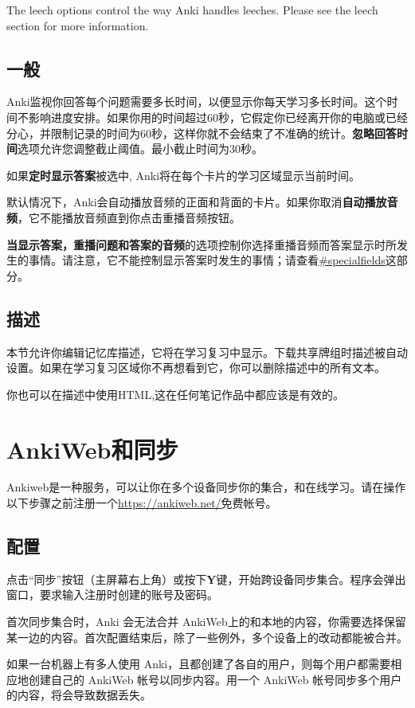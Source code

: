 \documentclass[a4paper]{book}
\begin{document}
	The leech options control the way Anki handles leeches. Please see the leech section for more information.
	\section{一般}
	Anki监视你回答每个问题需要多长时间，以便显示你每天学习多长时间。这个时间不影响进度安排。如果你用的时间超过60秒，它假定你已经离开你的电脑或已经分心，并限制记录的时间为60秒，这样你就不会结束了不准确的统计。\textbf{忽略回答时间}选项允许您调整截止阈值。最小截止时间为30秒。
	
	如果\textbf{定时显示答案}被选中, Anki将在每个卡片的学习区域显示当前时间。
	
	默认情况下，Anki会自动播放音频的正面和背面的卡片。如果你取消\textbf{自动播放音频}，它不能播放音频直到你点击重播音频按钮。
	
	\textbf{当显示答案，重播问题和答案的音频}的选项控制你选择重播音频而答案显示时所发生的事情。请注意，它不能控制显示答案时发生的事情；请查看\url{#specialfields}这部分。
	\section{描述}
	本节允许你编辑记忆库描述，它将在学习复习中显示。下载共享牌组时描述被自动设置。如果在学习复习区域你不再想看到它，你可以删除描述中的所有文本。
	
	你也可以在描述中使用HTML,这在任何笔记作品中都应该是有效的。
	
	
	\chapter{AnkiWeb和同步}
	
	Ankiweb是一种服务，可以让你在多个设备同步你的集合，和在线学习。请在操作以下步骤之前注册一个\url{https://ankiweb.net/}免费帐号。
	\section{配置}
	点击“同步”按钮（主屏幕右上角）或按下\textbf{Y}键，开始跨设备同步集合。程序会弹出窗口，要求输入注册时创建的账号及密码。
	
	首次同步集合时，Anki 会无法合并 AnkiWeb上的和本地的内容，你需要选择保留某一边的内容。首次配置结束后，除了一些例外，多个设备上的改动都能被合并。
	
	
	\begin{shaded}
		如果一台机器上有多人使用 Anki，且都创建了各自的用户，则每个用户都需要相应地创建自己的 AnkiWeb 帐号以同步内容。用一个 AnkiWeb 帐号同步多个用户的内容，将会导致数据丢失。
	\end{shaded}
	
\end{document}
